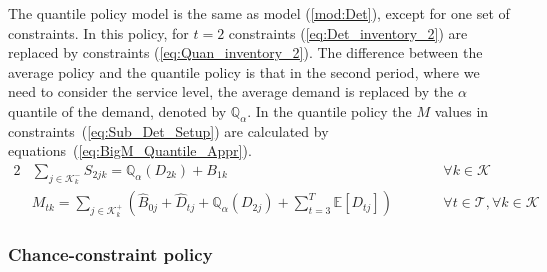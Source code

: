 \documentclass[11pt]{article}
\newcommand{\ti}{t} %
\newcommand{\TI}{\mathcal{T}}
\newcommand{\Ti}{T}
\newcommand{\ka}{k} %
\newcommand{\KA}{\mathcal{K}}
\newcommand{\jey}{j} %
\newcommand{\Csub}{\mathcal{K}^+_k}
\newcommand{\Psub}{\mathcal{K}^-_k}
\begin{document}
The quantile policy model is the same as model (\ref{mod:Det}), except for one set of constraints. In this policy, for $\ti =2$ constraints (\ref{eq:Det_inventory_2}) are replaced by constraints (\ref{eq:Quan_inventory_2}). The difference between the average policy and the quantile policy is that in the second period, where we need to consider the service level, the average demand is replaced by the $\alpha$ quantile of the demand, denoted by $\mathbb{Q}_{\alpha}$. %
In the quantile policy the $M$ values in constraints~(\ref{eq:Sub_Det_Setup}) are calculated by equations~(\ref{eq:BigM_Quantile_Appr}).
\begin{alignat}{2}
   & \sum_{\jey \in  \Psub} {S}_{2 \jey \ka} = \mathbb{Q}_{\alpha}({D}_{2 \ka}) + {B}_{1 \ka} && \quad \quad \forall \ka \in \KA  \label{eq:Quan_inventory_2} \\
     &  M_{\ti \ka} =  \sum_{\jey \in  \Csub}\left( \hat{B}_{0 \jey}+ {\hat{D}}_{\ti \jey} + \mathbb{Q}_{\alpha}({D}_{2 \jey})+ \sum_{\ti =3}^\Ti\mathbb{E}[{D}_{\ti \jey}]\right)  &&\qquad \forall \ti \in \TI , \forall \ka \in \KA   
  \label{eq:BigM_Quantile_Appr}
     \end{alignat}


\subsubsection{Chance-constraint policy}
\end{document}
